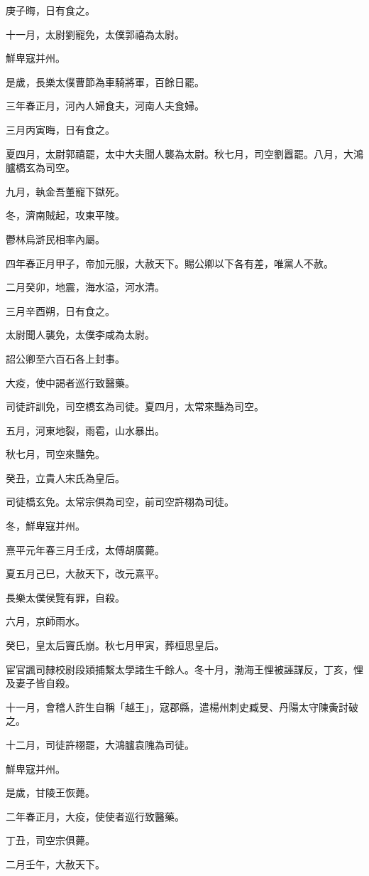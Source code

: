 \begin{pinyinscope}
庚子晦，日有食之。

十一月，太尉劉寵免，太僕郭禧為太尉。

鮮卑寇并州。

是歲，長樂太僕曹節為車騎將軍，百餘日罷。

三年春正月，河內人婦食夫，河南人夫食婦。

三月丙寅晦，日有食之。

夏四月，太尉郭禧罷，太中大夫聞人襲為太尉。秋七月，司空劉囂罷。八月，大鴻臚橋玄為司空。

九月，執金吾董寵下獄死。

冬，濟南賊起，攻東平陵。

鬱林烏滸民相率內屬。

四年春正月甲子，帝加元服，大赦天下。賜公卿以下各有差，唯黨人不赦。

二月癸卯，地震，海水溢，河水清。

三月辛酉朔，日有食之。

太尉聞人襲免，太僕李咸為太尉。

詔公卿至六百石各上封事。

大疫，使中謁者巡行致醫藥。

司徒許訓免，司空橋玄為司徒。夏四月，太常來豔為司空。

五月，河東地裂，雨雹，山水暴出。

秋七月，司空來豔免。

癸丑，立貴人宋氏為皇后。

司徒橋玄免。太常宗俱為司空，前司空許栩為司徒。

冬，鮮卑寇并州。

熹平元年春三月壬戌，太傅胡廣薨。

夏五月己巳，大赦天下，改元熹平。

長樂太僕侯覽有罪，自殺。

六月，京師雨水。

癸巳，皇太后竇氏崩。秋七月甲寅，葬桓思皇后。

宦官諷司隸校尉段熲捕繫太學諸生千餘人。冬十月，渤海王悝被誣謀反，丁亥，悝及妻子皆自殺。

十一月，會稽人許生自稱「越王」，寇郡縣，遣楊州刺史臧旻、丹陽太守陳夤討破之。

十二月，司徒許栩罷，大鴻臚袁隗為司徒。

鮮卑寇并州。

是歲，甘陵王恢薨。

二年春正月，大疫，使使者巡行致醫藥。

丁丑，司空宗俱薨。

二月壬午，大赦天下。


\end{pinyinscope}
